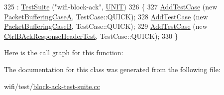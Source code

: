 \begin{DoxyCode}
325   : \hyperlink{classns3_1_1TestSuite_a904b0c40583b744d30908aeb94636d1a}{TestSuite} (\textcolor{stringliteral}{"wifi-block-ack"}, \hyperlink{classns3_1_1TestSuite_a1ebfcab34ec8161e085e8e3a1855eae0a3885375a3787abf60431f8454b3cadbd}{UNIT})
326 \{
327   \hyperlink{classns3_1_1TestCase_a3718088e3eefd5d6454569d2e0ddd835}{AddTestCase} (\textcolor{keyword}{new} \hyperlink{classPacketBufferingCaseA}{PacketBufferingCaseA}, TestCase::QUICK);
328   \hyperlink{classns3_1_1TestCase_a3718088e3eefd5d6454569d2e0ddd835}{AddTestCase} (\textcolor{keyword}{new} \hyperlink{classPacketBufferingCaseB}{PacketBufferingCaseB}, TestCase::QUICK);
329   \hyperlink{classns3_1_1TestCase_a3718088e3eefd5d6454569d2e0ddd835}{AddTestCase} (\textcolor{keyword}{new} \hyperlink{classCtrlBAckResponseHeaderTest}{CtrlBAckResponseHeaderTest}, TestCase::QUICK);
330 \}
\end{DoxyCode}


Here is the call graph for this function\+:




The documentation for this class was generated from the following file\+:\begin{DoxyCompactItemize}
\item 
wifi/test/\hyperlink{block-ack-test-suite_8cc}{block-\/ack-\/test-\/suite.\+cc}\end{DoxyCompactItemize}
